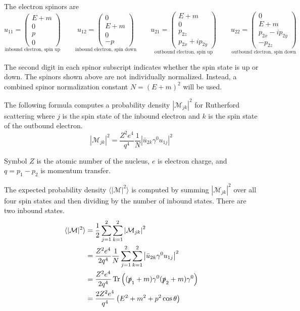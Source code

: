 \documentclass[12pt]{article}
\begin{document}
\bigskip
\noindent
The electron spinors are
\begin{equation*}
\underset{\text{inbound electron, spin up}}
{u_{11}=\begin{pmatrix}E+m\\0\\p\\0\end{pmatrix}}
\qquad
\underset{\text{inbound electron, spin down}}
{u_{12}=\begin{pmatrix}0\\E+m\\0\\-p\end{pmatrix}}
\qquad
\underset{\text{outbound electron, spin up}}
{u_{21}=\begin{pmatrix}E+m\\0\\p_{2z}\\p_{2x}+ip_{2y}\end{pmatrix}}
\qquad
\underset{\text{outbound electron, spin down}}
{u_{22}=\begin{pmatrix}0\\E+m\\p_{2x}-ip_{2y}\\-p_{2z}\end{pmatrix}}
\end{equation*}

\noindent
The second digit in each spinor subscript indicates whether the spin state is up or down.
The spinors shown above are not individually normalized.
Instead, a combined spinor normalization constant $N=(E+m)^2$ will be used.

\bigskip
\noindent
The following formula computes a probability density $|\mathcal{M}_{jk}|^2$ for Rutherford scattering
where $j$ is the spin state of the inbound electron and $k$ is the spin state of the outbound electron.
\begin{equation*}
|\mathcal{M}_{jk}|^2=\frac{Z^2e^4}{q^4}\frac{1}{N}\left|\bar{u}_{2k}\gamma^0 u_{1j}\right|^2
\end{equation*}

\noindent
Symbol $Z$ is the atomic number of the nucleus,
$e$ is electron charge,
and $q=p_1-p_2$ is momentum transfer.

\bigskip
\noindent
The expected probability density
$\langle\vert\mathcal{M}\vert^2\rangle$
is computed by summing $|\mathcal{M}_{jk}|^2$
over all four spin states and then dividing by the number of inbound states.
There are two inbound states.
\begin{align*}
\langle\vert\mathcal{M}\vert^2\rangle
&=\frac{1}{2}\sum_{j=1}^2\sum_{k=1}^2\left|\mathcal{M}_{jk}\right|^2
\\
&=\frac{Z^2e^4}{2q^4}\frac{1}{N}\sum_{j=1}^2\sum_{k=1}^2\left|\bar{u}_{2k}\gamma^0 u_{1j}\right|^2
\\
&=\frac{Z^2e^4}{2q^4}\mathop{\rm Tr}\left((\slashed{p}_1+m)\gamma^0(\slashed{p}_2+m)\gamma^0\right)
\\
&=\frac{2Z^2e^4}{q^4}\left(E^2+m^2+p^2\cos\theta\right)
\end{align*}
\end{document}
